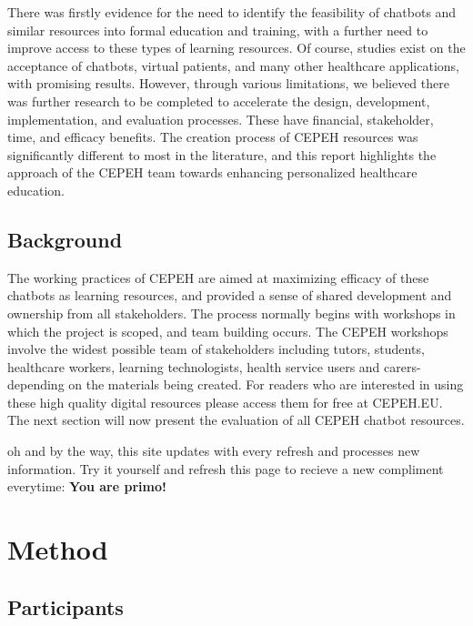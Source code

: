 \documentclass[a4paper, nobind]{templates/ociamthesis}
\begin{document}
There was ﬁrstly evidence for the need to identify the feasibility of chatbots and similar resources into formal education and training, with a further need to improve access to these types of learning resources. Of course, studies exist on the acceptance of chatbots, virtual patients, and many other healthcare applications, with promising results. However, through various limitations, we believed there was further research to be completed to accelerate the design, development, implementation, and evaluation processes. These have ﬁnancial, stakeholder, time, and eﬃcacy beneﬁts. The creation process of CEPEH resources was signiﬁcantly diﬀerent to most in the literature, and this report highlights the approach of the CEPEH team towards enhancing personalized healthcare education.

\hypertarget{sec-background}{%
\section*{Background}\label{sec-background}}

The working practices of CEPEH are aimed at maximizing efficacy of these chatbots as learning resources, and provided a sense of shared development and ownership from all stakeholders. The process normally begins with workshops in which the project is scoped, and team building occurs. The CEPEH workshops involve the widest possible team of stakeholders including tutors, students, healthcare workers, learning technologists, health service users and carers- depending on the materials being created. For readers who are interested in using these high quality digital resources please access them for free at CEPEH.EU. The next section will now present the evaluation of all CEPEH chatbot resources.

oh and by the way, this site updates with every refresh and processes new information. Try it yourself and refresh this page to recieve a new compliment everytime: \textbf{You are primo!}

\hypertarget{method}{%
\chapter{Method}\label{method}}

\minitoc 

\hypertarget{participants}{%
\section{Participants}\label{participants}}
\end{document}
